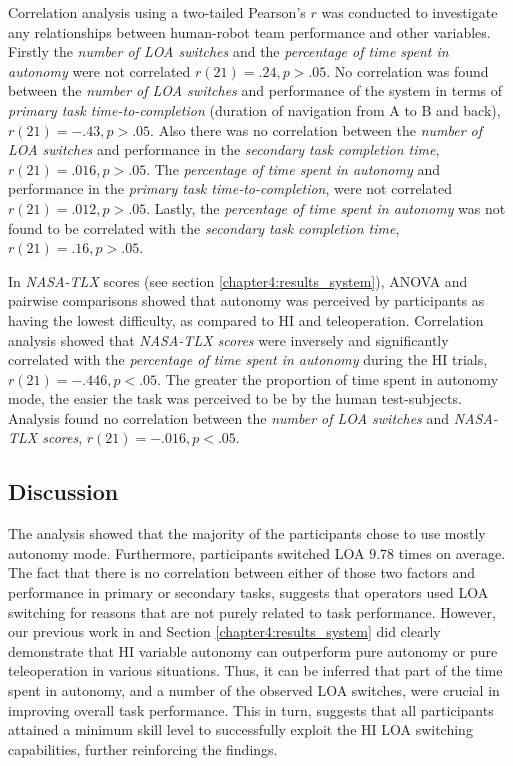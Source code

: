 \documentclass[a4paper,12pt,oneside,openright]{bhamthesis}
\begin{document}
Correlation analysis using a two-tailed Pearson's $r$ was conducted to investigate any relationships between human-robot team performance and other variables. Firstly the \textit{number of LOA switches} and the \textit{percentage of time spent in autonomy} were not correlated $r(21)= .24, p>.05 $. No correlation was found between the \textit{number of LOA switches} and performance of the system in terms of \textit{primary task time-to-completion} (duration of navigation from A to B and back), $r(21)= -.43, p>.05 $. Also there was no correlation between the \textit{number of LOA switches} and performance in the \textit{secondary task completion time}, $r(21)= .016, p>.05$. The \textit{percentage of time spent in autonomy} and performance in the \textit{primary task time-to-completion}, were not correlated $r(21)= .012, p > .05$. Lastly, the \textit{percentage of time spent in autonomy} was not found to be correlated with the \textit{secondary task completion time}, $r(21)= .16, p>.05$.

In \textit{NASA-TLX} scores (see section \ref{chapter4:results_system}), ANOVA and pairwise comparisons showed that autonomy was perceived by participants as having the lowest difficulty, as compared to HI and teleoperation. Correlation analysis showed that \textit{NASA-TLX scores} were inversely and significantly correlated with the \textit{percentage of time spent in autonomy} during the HI trials, $r(21)= -.446, p < .05$. The greater the proportion of time spent in autonomy mode, the easier the task was perceived to be by the human test-subjects. Analysis found no correlation between the \textit{number of LOA switches} and \textit{NASA-TLX scores}, $r(21)= -.016, p < .05$.

\subsection{Discussion}
The analysis showed that the majority of the participants chose to use mostly autonomy mode. Furthermore, participants switched LOA $9.78$ times on average. The fact that there is no correlation between either of those two factors and performance in primary or secondary tasks, suggests that operators used LOA switching for reasons that are not purely related to task performance. However, our previous work in \cite{Chiou2016} and Section \ref{chapter4:results_system} did clearly demonstrate that HI variable autonomy can outperform pure autonomy or pure teleoperation in various situations. Thus, it can be inferred that part of the time spent in autonomy, and a number of the observed LOA switches, were crucial in improving overall task performance. This in turn, suggests that all participants attained a minimum skill level to successfully exploit the HI LOA switching capabilities, further reinforcing the findings.
\end{document}
